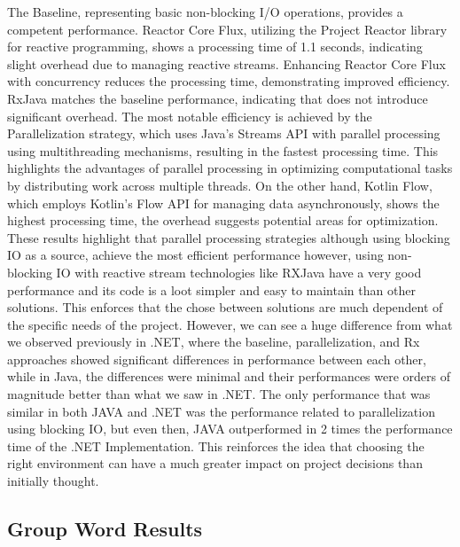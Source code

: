 The Baseline, representing basic non-blocking I/O operations, provides a competent performance. Reactor Core Flux, utilizing the Project Reactor library for reactive programming, shows a processing time of 1.1 seconds, indicating slight overhead due to managing reactive streams. Enhancing Reactor Core Flux with concurrency reduces the processing time, demonstrating improved efficiency.
RxJava matches the baseline performance, indicating that does not introduce significant overhead. The most notable efficiency is achieved by the Parallelization strategy, which uses Java's Streams API with parallel processing using multithreading mechanisms, resulting in the fastest processing time. This highlights the advantages of parallel processing in optimizing computational tasks by distributing work across multiple threads.
On the other hand, Kotlin Flow, which employs Kotlin's Flow API for managing data asynchronously, shows the highest processing time, the overhead suggests potential areas for optimization.
These results highlight that parallel processing strategies although using blocking IO as a source, achieve the most efficient performance however, using non-blocking IO with reactive stream technologies like RXJava have a very good performance and its code is a loot simpler and easy to maintain than other solutions. This enforces that the chose between solutions are much dependent of the specific needs of the project.
However, we can see a huge difference from what we observed previously in .NET, where the baseline, parallelization, and Rx approaches showed significant differences in performance between each other, while in Java, the differences were minimal and their performances were orders of magnitude better than what we saw in .NET. The only performance that was similar in both JAVA and .NET was the performance related to parallelization using blocking IO, but even then, JAVA outperformed in 2 times the performance time of the .NET Implementation.
This reinforces the idea that choosing the right environment can have a much greater impact on project decisions than initially thought.

    \subsection{Group Word Results}
    \label{subsubsec:group_word_results}
    
